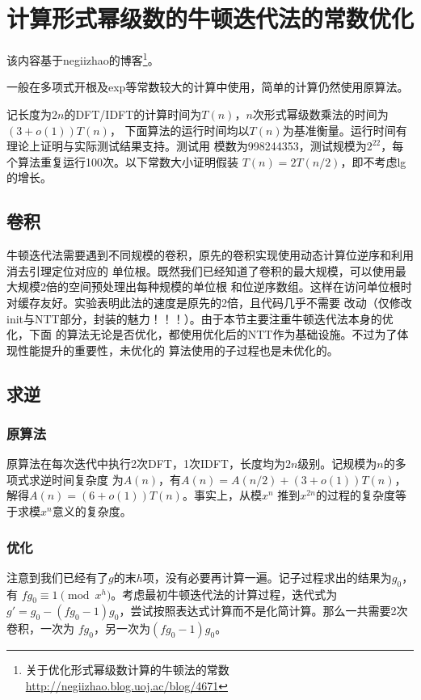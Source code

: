 \section{计算形式幂级数的牛顿迭代法的常数优化}\label{Optmize}
该内容基于negiizhao的博客\footnote{
    关于优化形式幂级数计算的牛顿法的常数\\
    \url{http://negiizhao.blog.uoj.ac/blog/4671}
}。

一般在多项式开根及exp等常数较大的计算中使用，简单的计算仍然使用原算法。

记长度为$2n$的DFT/IDFT的计算时间为$T(n)$，$n$次形式幂级数乘法的时间为$(3+o(1))T(n)$，
下面算法的运行时间均以$T(n)$为基准衡量。运行时间有理论上证明与实际测试结果支持。测试用
模数为998244353，测试规模为$2^{22}$，每个算法重复运行100次。以下常数大小证明假装
$T(n)=2T(n/2)$，即不考虑lg的增长。

\subsection{卷积}
牛顿迭代法需要遇到不同规模的卷积，原先的卷积实现使用动态计算位逆序和利用消去引理定位对应的
单位根。既然我们已经知道了卷积的最大规模，可以使用最大规模2倍的空间预处理出每种规模的单位根
和位逆序数组。这样在访问单位根时对缓存友好。实验表明此法的速度是原先的2倍，且代码几乎不需要
改动（仅修改init与NTT部分，封装的魅力！！！）。由于本节主要注重牛顿迭代法本身的优化，下面
的算法无论是否优化，都使用优化后的NTT作为基础设施。不过为了体现性能提升的重要性，未优化的
算法使用的子过程也是未优化的。

\subsection{求逆}
\subsubsection{原算法}
原算法在每次迭代中执行2次DFT，1次IDFT，长度均为$2n$级别。记规模为$n$的多项式求逆时间复杂度
为$A(n)$，有$A(n)=A(n/2)+(3+o(1))T(n)$，解得$A(n)=(6+o(1))T(n)$。事实上，从模$x^n$
推到$x^{2n}$的过程的复杂度等于求模$x^n$意义的复杂度。
\subsubsection{优化}
注意到我们已经有了$g$的末$h$项，没有必要再计算一遍。记子过程求出的结果为$g_0$，有
$fg_0\equiv 1\pmod{x^h}$。考虑最初牛顿迭代法的计算过程，迭代式为
$g'=g_0-(fg_0-1)g_0$，尝试按照表达式计算而不是化简计算。那么一共需要2次卷积，一次为
$fg_0$，另一次为$(fg_0-1)g_0$。

